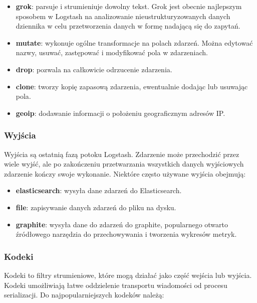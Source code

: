 \begin{itemize}
    \item \textbf{grok}: parsuje i strumieniuje dowolny tekst. Grok jest obecnie najlepszym sposobem w Logstash na analizowanie nieustrukturyzowanych danych dziennika w celu przetworzenia danych w formę nadającą się do zapytań\cite{logstashManualHowItWorks}. 
    \item \textbf{mutate}: wykonuje ogólne transformacje na polach zdarzeń. Można edytować nazwy, usuwać, zastępować i modyfikować pola w zdarzeniach.
    \item \textbf{drop}: pozwala na całkowicie odrzucenie zdarzenia\cite{logstashManualHowItWorks}.
    \item \textbf{clone}: tworzy kopię zapasową zdarzenia, ewentualnie dodając lub usuwając pola\cite{logstashManualHowItWorks}.
    \item \textbf{geoip}: dodawanie informacji o położeniu geograficznym adresów IP\cite{logstashManualHowItWorks}.
\end{itemize}

\subsubsection{Wyjścia}

Wyjścia są ostatnią fazą potoku Logstash. Zdarzenie może przechodzić przez wiele wyjść, ale po zakończeniu przetwarzania wszystkich danych wyjściowych zdarzenie kończy swoje wykonanie\cite{logstashManualHowItWorks}.
Niektóre często używane wyjścia obejmują:

\begin{itemize}
    \item \textbf{elasticsearch}: wysyła dane zdarzeń do Elasticsearch\cite{logstashManualHowItWorks}.
    \item \textbf{file}: zapisywanie danych zdarzeń do pliku na dysku\cite{logstashManualHowItWorks}.
    \item \textbf{graphite}: wysyła dane do zdarzeń do graphite, popularnego otwarto źródłowego narzędzia do przechowywania i tworzenia wykresów metryk\cite{logstashManualHowItWorks}.
\end{itemize}

\subsubsection{Kodeki}

Kodeki to filtry strumieniowe, które mogą działać jako część wejścia lub wyjścia. Kodeki umożliwiają łatwe oddzielenie transportu wiadomości od procesu serializacji. Do najpopularniejszych kodeków należą:

